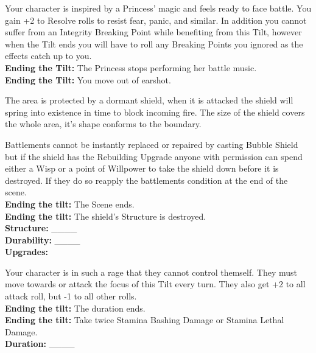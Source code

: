 \documentclass[10pt, frontgrid, backgrid]{flacards}
\begin{document}
{Your character is inspired by a Princess' magic and feels ready to face battle. You gain +2 to Resolve rolls to resist fear, panic, and similar. In addition you cannot suffer from an Integrity Breaking Point while benefiting from this Tilt, however when the Tilt ends you will have to roll any Breaking Points you ignored as the effects catch up to you. \\

\textbf{Ending the Tilt:} The Princess stops performing her battle music. \\
\textbf{Ending the Tilt:} You move out of earshot. }

{The area is protected by a dormant shield, when it is attacked the shield will spring into existence in time to block incoming fire. The size of the shield covers the whole area, it's shape conforms to the boundary. 

Battlements cannot be instantly replaced or repaired by casting Bubble Shield but if the shield has the Rebuilding Upgrade anyone with permission can spend either a Wisp or a point of Willpower to take the shield down before it is destroyed. If they do so reapply the battlements condition at the end of the scene. \\

\textbf{Ending the tilt:} The Scene ends.\\
\textbf{Ending the tilt:} The shield's Structure is destroyed.\\
\textbf{Structure:} \_\_\_\_\\
\textbf{Durability:} \_\_\_\_\\
\textbf{Upgrades:} \fillunderline}

{
Your character is in such a rage that they cannot control themself. They must move towards or attack the focus of this Tilt every turn. They also get +2 to all attack roll, but -1 to all other rolls. \\

\textbf{Ending the tilt:} The duration ends.\\
\textbf{Ending the tilt:} Take twice Stamina Bashing Damage or Stamina Lethal Damage.\\
\textbf{Duration:} \_\_\_\_
}

\end{document}
